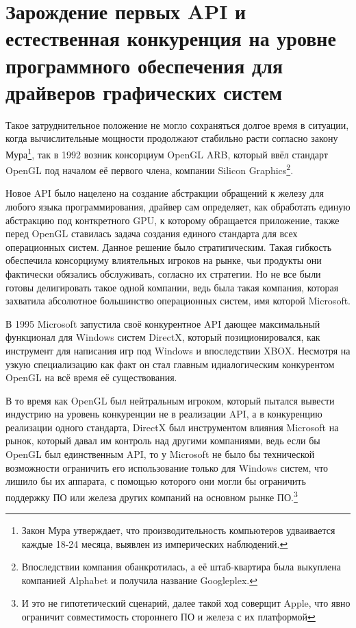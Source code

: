 \documentclass[12pt,a4paper]{article}
\begin{document}
\section{Зарождение первых API и естественная конкуренция на уровне программного 
обеспечения для драйверов графических систем}

Такое затруднительное положение не могло сохраняться долгое время в ситуации, когда
вычислительные мощности продолжают стабильно расти согласно закону Мура\footnote{Закон Мура 
утверждает, что производительность компьютеров удваивается каждые 18-24 месяца, 
выявлен из имперических наблюдений.}, так в 1992 
возник консорциум OpenGL ARB, который ввёл стандарт OpenGL под началом её первого
члена, компании Silicon Graphics\footnote{Впоследствии компания обанкротилась, а её 
штаб-квартира была выкуплена компанией Alphabet и получила название Googleplex.}. 

Новое API было нацелено на создание абстракции обращений к железу для любого языка 
программирования, драйвер сам определяет, как обработать единую абстракцию под конткретного
GPU, к которому обращается приложение, также перед OpenGL ставилась задача создания 
единого стандарта для всех операционных систем. Данное решение было стратигическим. 
Такая гибкость обеспечила консорциуму влиятельных игроков на рынке, чьи продукты они 
фактически обязались обслуживать, согласно их стратегии. Но не все были готовы делигировать
такое одной компании, ведь была такая компания, которая захватила абсолютное большинство 
операционных систем, имя которой Microsoft. 

В 1995 Microsoft запустила своё конкурентное API дающее максимальный функционал для 
Windows систем DirectX, который позиционировался, как инструмент для написания игр под
Windows и впоследствии XBOX. Несмотря на узкую специализацию как факт он стал главным 
идиалогическим конкурентом OpenGL на всё время её существования.

В то время как OpenGL был нейтральным игроком, который пытался вывести индустрию на 
уровень конкуренции не в реализации API, а в конкуренцию реализации одного стандарта, 
DirectX был инструментом влияния Microsoft на рынок, который давал им контроль над 
другими компаниями, ведь если бы OpenGL был единственным API, то у Microsoft не было бы
технической возможности ограничить его использование только для Windows систем, что лишило
бы их аппарата, с помощью которого они могли бы ограничить поддержку ПО или железа других
компаний на основном рынке ПО.\footnote{И это не гипотетический сценарий, далее такой ход 
соверщит Apple, что явно ограничит совместимость стороннего ПО и железа с их платформой}
\end{document}
